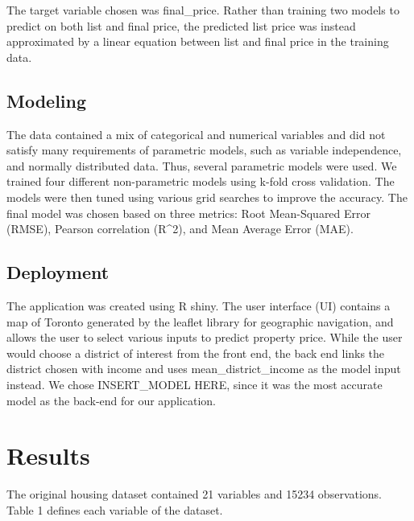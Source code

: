 \documentclass[11pt,]{article}
\begin{document}
The target variable chosen was final\_price. Rather than training two
models to predict on both list and final price, the predicted list price
was instead approximated by a linear equation between list and final
price in the training data.

\hypertarget{modeling}{%
\subsection{Modeling}\label{modeling}}

The data contained a mix of categorical and numerical variables and did
not satisfy many requirements of parametric models, such as variable
independence, and normally distributed data. Thus, several parametric
models were used. We trained four different non-parametric models using
k-fold cross validation. The models were then tuned using various grid
searches to improve the accuracy. The final model was chosen based on
three metrics: Root Mean-Squared Error (RMSE), Pearson correlation
(R\^{}2), and Mean Average Error (MAE).

\hypertarget{deployment}{%
\subsection{Deployment}\label{deployment}}

The application was created using R shiny. The user interface (UI)
contains a map of Toronto generated by the leaflet library for
geographic navigation, and allows the user to select various inputs to
predict property price. While the user would choose a district of
interest from the front end, the back end links the district chosen with
income and uses mean\_district\_income as the model input instead. We
chose INSERT\_MODEL HERE, since it was the most accurate model as the
back-end for our application.

\hypertarget{results}{%
\section{Results}\label{results}}

The original housing dataset contained 21 variables and 15234
observations. Table 1 defines each variable of the dataset.
\end{document}
